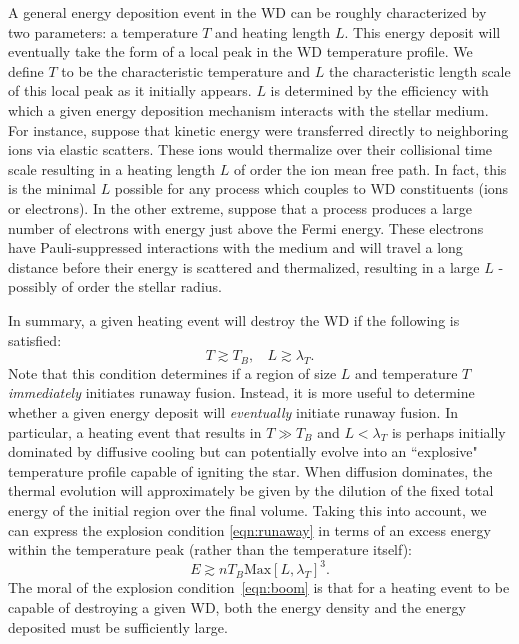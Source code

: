 \documentclass[twocolumn,showpacs,preprintnumbers,amsmath,amssymb,prd]{revtex4}
\begin{document}
A general energy deposition event in the WD can be roughly characterized by two parameters: a temperature $T$ and heating length $L$. This energy deposit will eventually take the form of a local peak in the WD temperature profile. We define $T$ to be the characteristic temperature and $L$ the characteristic length scale of this local peak as it initially appears. $L$ is determined by the efficiency with which a given energy deposition mechanism interacts with the stellar medium. For instance, suppose that kinetic energy were transferred directly to neighboring ions via elastic scatters. These ions would thermalize over their collisional time scale resulting in a heating length $L$ of order the ion mean free path. In fact, this is the minimal $L$ possible for any process which couples to WD constituents (ions or electrons). In the other extreme, suppose that a process produces a large number of electrons with energy just above the Fermi energy.  These electrons have Pauli-suppressed interactions with the medium and will travel a long distance before their energy is scattered and thermalized, resulting in a large $L$ - possibly of order the stellar radius. 

In summary, a given heating event will destroy the WD if the following is satisfied:
\begin{equation}
\label{eqn:runaway}
T \gtrsim T_B, ~~~~ L \gtrsim \lambda_T.
\end{equation}
Note that this condition determines if a region of size $L$ and temperature $T$ \emph{immediately} initiates runaway fusion.  Instead, it is more useful to determine whether a given energy deposit will \emph{eventually} initiate runaway fusion. In particular, a heating event that results in $T \gg T_B$ and $L  < \lambda_T$ is perhaps initially dominated by diffusive cooling but can potentially evolve into an ``explosive" temperature profile capable of igniting the star. When diffusion dominates, the thermal evolution will approximately be given by the dilution of the fixed total energy of the initial region over the final volume. Taking this into account, we can express the explosion condition \eqref{eqn:runaway} in terms of an excess energy within the temperature peak (rather than the temperature itself):
\begin{equation}
\label{eqn:boom}
E \gtrsim n T_B \text{Max}\left[L, \lambda_T\right]^3.
\end{equation}
The moral of the explosion condition~\ref{eqn:boom} is that for a heating event to be capable of destroying a given WD, both the energy density and the energy deposited must be sufficiently large. 
\end{document}
